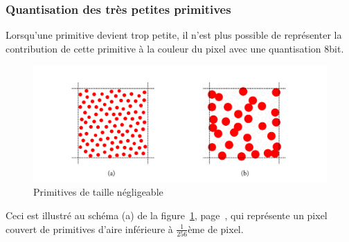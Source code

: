 		\subsubsection{Quantisation des très petites primitives }
			Lorsqu'une primitive devient trop petite, il n'est plus possible de 
			représenter la contribution de cette primitive à la couleur du pixel avec une quantisation 8bit. 
				\begin{figure}[ht]
					\centering
					\includegraphics[width=\textwidth]{images/petites-primitives} 
					\caption{Primitives de taille négligeable}
					\label{fig:petit}
				\end{figure}
			Ceci est illustré au schéma (a) de la figure~\ref{fig:petit}, page~\pageref{fig:petit}, qui
			représente un pixel couvert de primitives d'aire inférieure à $\frac{1}{256}$ème de pixel.


